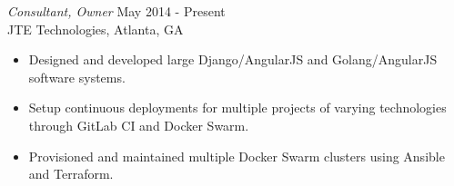 \documentclass[margin, 10pt]{res} %
\begin{document}
\begin{resume}
{\sl Consultant, Owner} \hfill May 2014 - Present\\
JTE Technologies, Atlanta, GA
\begin{itemize} 
\item Designed and developed large Django/AngularJS and Golang/AngularJS software systems.
\item Setup continuous deployments for multiple projects of varying technologies through GitLab CI and Docker Swarm.
\item Provisioned and maintained multiple Docker Swarm clusters using Ansible and Terraform.
\end{itemize} 


\end{resume}
\end{document}
